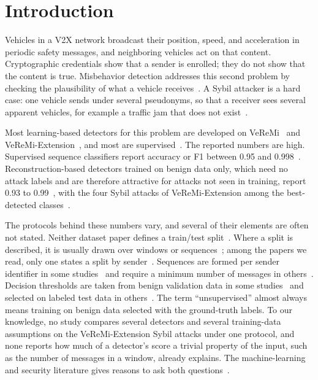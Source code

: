 \section{Introduction}
\label{sec:intro}

Vehicles in a V2X network broadcast their position, speed, and acceleration in periodic safety messages, and
neighboring vehicles act on that content. Cryptographic credentials show that a sender is enrolled; they do not show
that the content is true. Misbehavior detection addresses this second problem by checking the plausibility of what
a vehicle receives~\cite{heijden2018veremi,kamel2020veremi}. A Sybil attacker is a hard case: one vehicle sends
under several pseudonyms, so that a receiver sees several apparent vehicles, for example a traffic jam that does
not exist~\cite{kamel2019misbehavior}.

Most learning-based detectors for this problem are developed on VeReMi~\cite{heijden2018veremi} and
VeReMi-Extension~\cite{kamel2020veremi}, and most are supervised~\cite{boualouache2023survey}. The reported
numbers are high. Supervised sequence classifiers report accuracy or F1 between 0.95 and
0.998~\cite{alladi2023deep,hamhoum2024mistralbsm,youness2025vemisnet}. Reconstruction-based detectors trained on
benign data only, which need no attack labels and are therefore attractive for attacks not seen in training, report
0.93 to 0.99~\cite{alladi2021deepadv,alladi2021deep,kalogiannis2026pampos,zhong2023sybil}, with the four Sybil
attacks of VeReMi-Extension among the best-detected
classes~\cite{alladi2021deep,kalogiannis2026pampos}.

The protocols behind these numbers vary, and several of their elements are often not stated. Neither dataset paper
defines a train/test split~\cite{heijden2018veremi,kamel2020veremi}. Where a split is described, it is usually
drawn over windows or sequences~\cite{franceschini2025line,youness2025vemisnet}; among the papers we read, only one
states a split by sender~\cite{kalogiannis2026pampos}. Sequences are formed per sender identifier in some
studies~\cite{hamhoum2024mistralbsm} and require a minimum number of messages in
others~\cite{kalogiannis2026pampos}. Decision thresholds are taken from benign validation data in some
studies~\cite{kalogiannis2026pampos} and selected on labeled test data in others~\cite{alladi2021deep}. The term
``unsupervised'' almost always means training on benign data selected with the ground-truth labels. To our
knowledge, no study compares several detectors and several training-data assumptions on the VeReMi-Extension Sybil
attacks under one protocol, and none reports how much of a detector's score a trivial property of the input, such
as the number of messages in a window, already explains. The machine-learning and security literature gives reasons
to ask both questions~\cite{arp2022dos,geirhos2020shortcut,kapoor2023leakage,wu2021current}.


